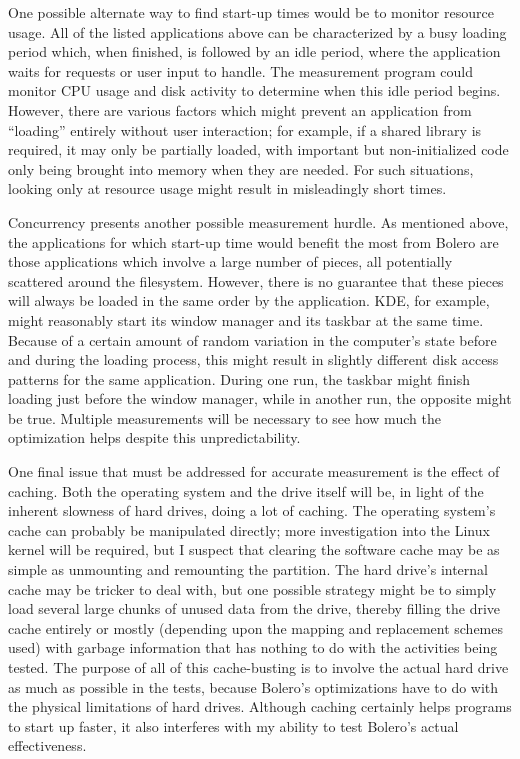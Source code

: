 \documentclass[10pt,twocolumn,letterpaper]{article}
\begin{document}
One possible alternate way to find start-up times would be to monitor resource usage. All of the listed applications
above can be characterized by a busy loading period which, when finished, is followed by an idle period, where
the application waits for requests or user input to handle. The measurement program could monitor CPU usage and disk
activity to determine when this idle period begins. However, there are various factors which might prevent an application from ``loading'' entirely without user interaction; for example, if a shared library is required, it may only be partially loaded, with important but non-initialized code only being brought into memory when they are needed. For such situations, looking only at resource usage might result in misleadingly short times.

Concurrency presents another possible measurement hurdle. As mentioned above, the applications for
which start-up time would benefit the most from Bolero are those applications which involve a
large number of pieces, all potentially scattered around the filesystem. However, there is no guarantee
that these pieces will always be loaded in the same order by the application. KDE, for example, might reasonably start its window manager and its taskbar at the same time. Because of a certain amount of random
variation in the computer's state before and during the loading process, this might result in
slightly different disk access patterns for the same application. During one run, the taskbar might finish loading just before the window manager, while in another run, the opposite might be true. Multiple
measurements will be necessary to see how much the optimization helps despite this unpredictability.

One final issue that must be addressed for accurate measurement is the effect of caching. Both
the operating system and the drive itself will be, in light of the inherent slowness of hard drives,
doing a lot of caching. The operating system's cache can probably be manipulated directly; more
investigation into the Linux kernel will be required, but I suspect that clearing the software
cache may be as simple as unmounting and remounting the partition. The hard drive's internal cache
may be tricker to deal with, but one possible strategy might be to simply load several large chunks of
unused data from the drive, thereby filling the drive cache entirely or mostly (depending upon the mapping
and replacement schemes used) with garbage information that has nothing to do with the activities being tested.
The purpose of all of this cache-busting is to involve the actual hard drive as much as possible
in the tests, because Bolero's optimizations have to do with the physical limitations of hard drives. Although caching certainly helps programs to start up faster, it also interferes with my ability to test Bolero's actual effectiveness.
\end{document}
